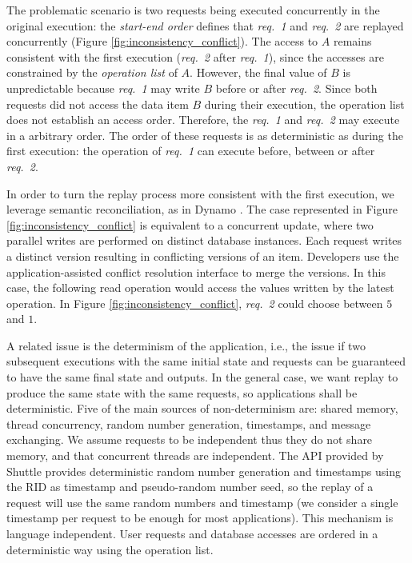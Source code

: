 \documentclass[10pt,conference]{IEEEtran}
\begin{document}
The problematic scenario is two requests being executed concurrently in the original execution: the \emph{start-end order} defines that \emph{req.~1} and \emph{req.~2} are replayed concurrently (Figure \ref{fig:inconsistency_conflict}). The access to $A$ remains consistent with the first execution (\emph{req.~2} after \emph{req.~1}), since the accesses are constrained by the \emph{operation list} of $A$. However, the final value of $B$ is unpredictable because \emph{req.~1} may write $B$ before or after \emph{req.~2}. Since both requests did not access the data item $B$ during their execution, the operation list does not establish an access order. Therefore, the \emph{req.~1} and \emph{req.~2} may execute in a arbitrary order. The order of these requests is as deterministic as during the first execution: the operation of \emph{req.~1} can execute before, between or after \emph{req.~2}.

In order to turn the replay process more consistent with the first execution, we leverage semantic reconciliation, as in Dynamo \cite{Decandia2007}. The case represented in Figure \ref{fig:inconsistency_conflict} is equivalent to a concurrent update, where two parallel writes are performed on distinct database instances. Each request writes a distinct version resulting in conflicting versions of an item. Developers use the application-assisted conflict resolution interface to merge the versions. In this case, the following read operation would access the values written by the latest operation. In Figure \ref{fig:inconsistency_conflict}, \emph{req.~2} could choose between $5$ and $1$.

A related issue is the determinism of the application, i.e., the issue if two subsequent executions with the same initial state and requests can be guaranteed to have the same final state and outputs. In the general case, we want replay to produce the same state with the same requests, so applications shall be deterministic. 
Five of the main sources of non-determinism are: shared memory, thread concurrency, random number generation, timestamps, and message exchanging. We assume requests to be independent thus they do not share memory, and that concurrent threads are independent. The API provided by Shuttle provides deterministic random number generation and timestamps using the \ac{RID} as timestamp and pseudo-random number seed, so the replay of a request will use the same random numbers and timestamp (we consider a single timestamp per request to be enough for most applications). This mechanism is language independent. User requests and database accesses are ordered in a deterministic way using the operation list.
\end{document}
